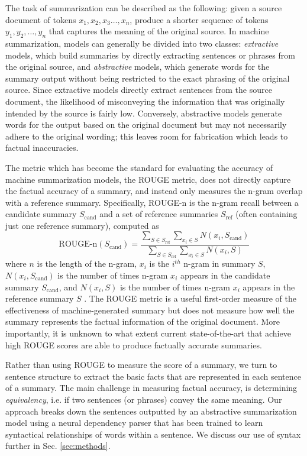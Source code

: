 \documentclass{article}
\begin{document}
The task of summarization can be described as the following: given a source document of tokens $x_1, x_2, x_3 \dots, x_n$, produce a shorter sequence of tokens $y_1, y_2, \dots, y_n$ that captures the meaning of the original source. In machine summarization, models can generally be divided into two classes: \textit{extractive} models, which build summaries by directly extracting sentences or phrases from the original source, and \textit{abstractive} models, which generate words for the summary output without being restricted to the exact phrasing of the original source. Since extractive models directly extract sentences from the source document, the likelihood of misconveying the information that was originally intended by the source is fairly low. Conversely, abstractive models generate words for the output based on the original document but may not necessarily adhere to the original wording; this leaves room for fabrication which leads to factual inaccuracies. 

The metric which has become the standard for evaluating the accuracy of machine summarization models, the ROUGE metric, does not directly capture the factual accuracy of a summary, and instead only measures the n-gram overlap with a reference summary. Specifically, ROUGE-n is the n-gram recall between a candidate summary $S_{\text{cand}}$ and a set of reference summaries $S_{\text{ref}}$ (often containing just one reference summary), computed as
$$\text{ROUGE-n}(S_{\text{cand}}) = \frac{\sum \limits_{S \in S_{\text{ref}}} \sum \limits_{x_i \in S} N(x_i, S_{\text{cand}})}{\sum \limits_{S \in S_{\text{ref}}} \sum \limits_{x_i \in S} N(x_i, S)}$$
where $n$ is the length of the n-gram, $x_i$ is the $i^{th}$ n-gram in summary $S$, $N(x_i, S_{\text{cand}})$ is the number of times n-gram $x_i$ appears in the candidate summary $S_{\text{cand}}$, and $N(x_i, S)$ is the number of times n-gram $x_i$ appears in the reference summary $S$ \cite{lin2004rouge}. The ROUGE metric is a useful first-order measure of the effectiveness of machine-generated summary but does not measure how well the summary represents the factual information of the original document. More importantly, it is unknown to what extent current state-of-the-art that achieve high ROUGE scores are able to produce factually accurate summaries.

Rather than using ROUGE to measure the score of a summary, we turn to sentence structure to extract the basic facts that are represented in each sentence of a summary. The main challenge in measuring factual accuracy, is determining \textit{equivalency}, i.e. if two sentences (or phrases) convey the same meaning. Our approach breaks down the sentences outputted by an abstractive summarization model using a neural dependency parser that has been trained to learn syntactical relationships of words within a sentence. We discuss our use of syntax further in Sec. \ref{sec:methods}. 
\end{document}
